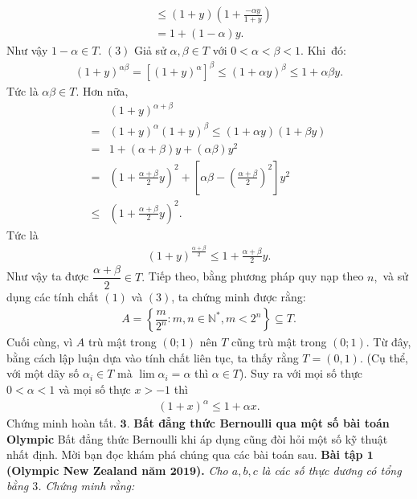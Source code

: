 \begin{multicols}{2}
\begin{align*}
			&\le (1+y)\left(1+\frac{-\alpha y}{1+y}\right) \\
			&=1+(1-\alpha) y .
		\end{align*}
		Như vậy $1- \alpha \in  T$.
		\vskip 0.1cm
		$(3)$ Giả sử $\alpha, \beta \in T$ với $0<\alpha < \beta <1$. Khi~đó:
		\begin{align*}
			(1\!\!+\!\!y)^{\alpha  \beta}\!=\!\left[(1\!\!+\!\!y)^{\alpha}\right]^{\beta} \!\!\leq\!\! (1\!\!+\!\alpha y)^{\beta} \!\!\le\!\! 1\!\!+\!\alpha  \beta y.
		\end{align*}
		Tức là $\alpha \beta \in T$. Hơn nữa,
		\begin{align*}
			&(1+y)^{\alpha+\beta} \\
			=&(1+y)^{\alpha}(1+y)^{\beta} \leq (1+\alpha y)(1+\beta y) \\
			=&1+(\alpha+\beta) y+(\alpha  \beta) y^{2} \\
			=&\left(\!1\!+\!\frac{\alpha+\beta}{2} y\right)^{2}\!+\!\left[\alpha  \beta\!-\!\left(\frac{\alpha\!+\!\beta}{2}\right)^{2}\right] y^{2} \\
			\leq&\left(\!1+\frac{\alpha+\beta}{2} y\right)^{2}.
		\end{align*}
		Tức là
		\begin{align*}
			(1+y)^{\frac{\alpha+\beta}{2}} \leq 1+\frac{\alpha+\beta}{2} y.
		\end{align*}
		Như vậy ta được $\dfrac{\alpha +\beta }{2} \in T.$
		\vskip 0.1cm
		Tiếp theo, bằng phương pháp quy nạp theo $n,$ và sử dụng các tính chất $(1)$ và $(3)$, ta chứng minh được rằng: 
		\begin{align*}
			A=\left\{\dfrac{m}{2^n}:m,n \in \mathbb{N}^*,m<2^n\right\} \subseteq T.
		\end{align*}
		Cuối cùng, vì $A$ trù mật trong $(0;1)$ nên $T$ cũng trù mật trong $(0;1)$. Từ đây, bằng cách lập luận dựa vào tính chất liên tục, ta thấy rằng $T=(0,1)$. (Cụ thể, với một dãy số $\alpha_i\in T$ mà $\lim\alpha_i= \alpha$ thì $\alpha \in T$).
		Suy ra với mọi số thực $0<\alpha <1$ và mọi số thực $x>-1$ thì
		\begin{align*}
			(1+x)^{\alpha} \le 1+ \alpha x.
		\end{align*}
			Chứng minh hoàn tất.
		\vskip 0.1cm
		$\pmb{3.}$ \textbf{\color{hoccungpi}Bất đẳng thức Bernoulli qua một số bài toán Olympic}
		\vskip 0.1cm
		Bất đẳng thức Bernoulli khi áp dụng cũng đòi hỏi một số kỹ thuật nhất định. Mời bạn đọc khám phá chúng qua các bài toán sau.
		\vskip 0.1cm
		\textbf{\color{hoccungpi}Bài tập $\pmb{1}$ (Olympic New Zealand  năm $\pmb{2019}$).}
		\textit{Cho $a,b,c$ là các số thực dương có tổng bằng $3$. Chứng minh rằng:}

\end{multicols}
